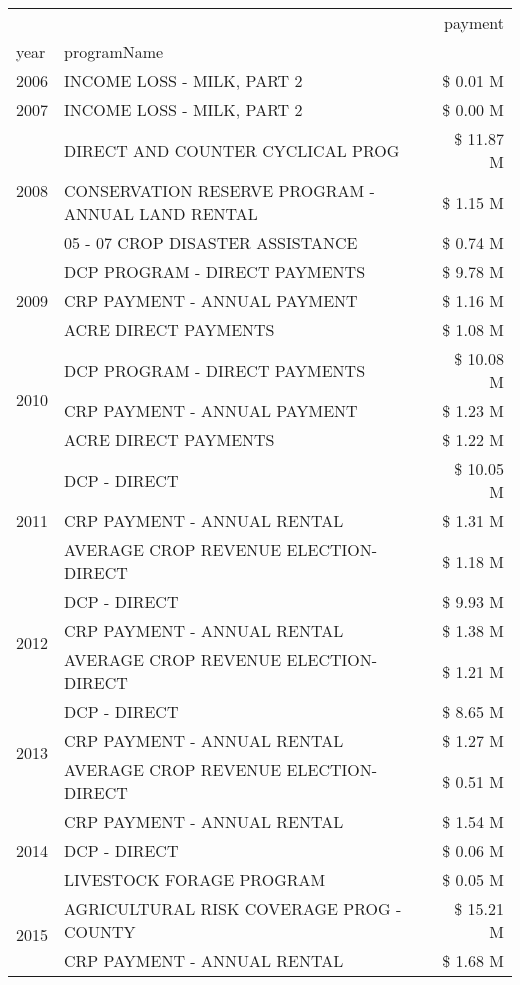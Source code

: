\begin{tabular}{llr}
\toprule
 &  & payment \\
year & programName &  \\
\midrule
2006 & INCOME LOSS - MILK, PART 2 & \$ 0.01 M \\
\cline{1-3}
2007 & INCOME LOSS - MILK, PART 2 & \$ 0.00 M \\
\cline{1-3}
\multirow[t]{3}{*}{2008} & DIRECT AND COUNTER CYCLICAL PROG & \$ 11.87 M \\
 & CONSERVATION RESERVE PROGRAM - ANNUAL LAND RENTAL & \$ 1.15 M \\
 & 05 - 07 CROP DISASTER ASSISTANCE & \$ 0.74 M \\
\cline{1-3}
\multirow[t]{3}{*}{2009} & DCP PROGRAM - DIRECT PAYMENTS & \$ 9.78 M \\
 & CRP PAYMENT - ANNUAL PAYMENT & \$ 1.16 M \\
 & ACRE DIRECT PAYMENTS & \$ 1.08 M \\
\cline{1-3}
\multirow[t]{3}{*}{2010} & DCP PROGRAM - DIRECT PAYMENTS & \$ 10.08 M \\
 & CRP PAYMENT - ANNUAL PAYMENT & \$ 1.23 M \\
 & ACRE DIRECT PAYMENTS & \$ 1.22 M \\
\cline{1-3}
\multirow[t]{3}{*}{2011} & DCP - DIRECT & \$ 10.05 M \\
 & CRP PAYMENT - ANNUAL RENTAL & \$ 1.31 M \\
 & AVERAGE CROP REVENUE ELECTION-DIRECT & \$ 1.18 M \\
\cline{1-3}
\multirow[t]{3}{*}{2012} & DCP - DIRECT & \$ 9.93 M \\
 & CRP PAYMENT - ANNUAL RENTAL & \$ 1.38 M \\
 & AVERAGE CROP REVENUE ELECTION-DIRECT & \$ 1.21 M \\
\cline{1-3}
\multirow[t]{3}{*}{2013} & DCP - DIRECT & \$ 8.65 M \\
 & CRP PAYMENT - ANNUAL RENTAL & \$ 1.27 M \\
 & AVERAGE CROP REVENUE ELECTION-DIRECT & \$ 0.51 M \\
\cline{1-3}
\multirow[t]{3}{*}{2014} & CRP PAYMENT - ANNUAL RENTAL & \$ 1.54 M \\
 & DCP - DIRECT & \$ 0.06 M \\
 & LIVESTOCK FORAGE PROGRAM & \$ 0.05 M \\
\cline{1-3}
\multirow[t]{3}{*}{2015} & AGRICULTURAL RISK COVERAGE PROG - COUNTY & \$ 15.21 M \\
 & CRP PAYMENT - ANNUAL RENTAL & \$ 1.68 M \\

\end{tabular}
